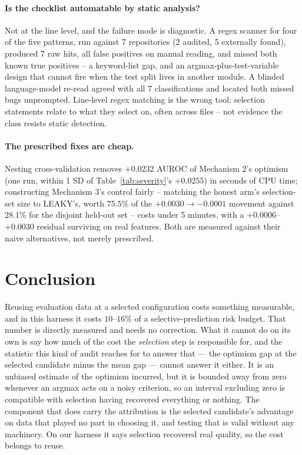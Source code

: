 \documentclass{article}
\begin{document}
\paragraph{Is the checklist automatable by static analysis?} Not at the line
level, and the failure mode is diagnostic. A regex scanner for four of the five
patterns, run against 7 repositories (2 audited, 5 externally found), produced
7 raw hits, all false positives on manual reading, and missed both known true
positives -- a keyword-list gap, and an argmax-plus-test-variable design that
cannot fire when the test split lives in another module. A blinded
language-model re-read agreed with all 7 classifications and located both
missed bugs unprompted. Line-level regex matching is the wrong tool: selection
statements relate to what they select on, often across files -- not evidence
the class resists static detection.

\paragraph{The prescribed fixes are cheap.} Nesting cross-validation removes
$+0.0232$ AUROC of Mechanism 2's optimism (one run, within 1 SD of
Table~\ref{tab:severity}'s $+0.0255$) in seconds of CPU time; constructing
Mechanism 3's control fairly -- matching the honest arm's selection-set size to
LEAKY's, worth $75.5\%$ of the $+0.0030\to-0.0001$ movement against $28.1\%$
for the disjoint held-out set -- costs under 5 minutes, with a
$+0.0006$--$+0.0030$ residual surviving on real features. Both are measured
against their naive alternatives, not merely prescribed.

\section{Conclusion}

Reusing evaluation data at a selected configuration costs something
measurable, and in this harness it costs $10$--$16\%$ of a
selective-prediction risk budget. That number is directly measured and needs
no correction. What it cannot do on its own is say how much of the cost the
\emph{selection} step is responsible for, and the statistic this kind of
audit reaches for to answer that --- the optimism gap at the selected
candidate minus the mean gap --- cannot answer it either. It is an unbiased
estimate of the optimism incurred, but it is bounded away from zero whenever
an argmax acts on a noisy criterion, so an interval excluding zero is
compatible with selection having recovered everything or nothing. The
component that does carry the attribution is the selected candidate's
advantage on data that played no part in choosing it, and testing that is
valid without any machinery. On our harness it says selection recovered real
quality, so the cost belongs to reuse.
\end{document}
